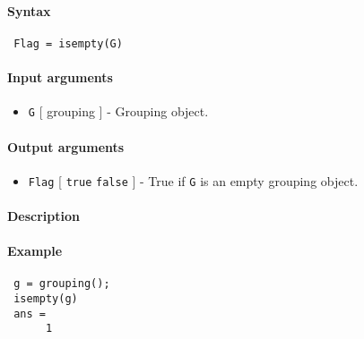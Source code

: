 


	\paragraph{Syntax}
 
 \begin{verbatim}
 Flag = isempty(G)
 \end{verbatim}
 
 \paragraph{Input arguments}
 
 \begin{itemize}
 \item
   \texttt{G} {[} grouping {]} - Grouping object.
 \end{itemize}
 
 \paragraph{Output arguments}
 
 \begin{itemize}
 \item
   \texttt{Flag} {[} \texttt{true} \textbar{} \texttt{false} {]} - True
   if \texttt{G} is an empty grouping object.
 \end{itemize}
 
 \paragraph{Description}
 
 \paragraph{Example}
 
 \begin{verbatim}
 g = grouping();
 isempty(g)
 ans = 
      1
 \end{verbatim}


